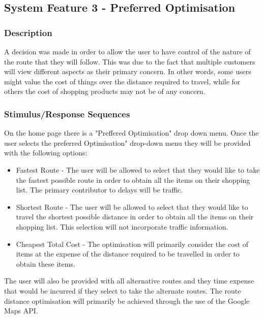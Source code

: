 \documentclass[10pt, a4paper, onecolumn]{scrartcl}
\begin{document}
		\subsection{System Feature 3 - Preferred Optimisation}
		
			\subsubsection{Description}
			
				A decision was made in order to allow the user to have control of the nature of the route that they will follow. This was due to the fact that multiple customers will view different aspects as their primary concern. In other words, some users might value the cost of things over the distance required to travel, while for others the cost of shopping products may not be of any concern. 
			
			\subsubsection{Stimulus/Response Sequences}
			
				On the home page there is a "Preffered Optimisation" drop down menu. Once the user selects the preferred Optimisation" drop-down menu they will be provided with the following options:
				
				\begin{itemize}
					\item Fastest Route - The user will be allowed to select that they would like to take the fastest possible route in order to obtain all the items on their shopping list. The primary contributor to delays will be traffic.
					\item Shortest Route - The user will be allowed to select that they would like to travel the shortest possible distance in order to obtain all the items on their shopping list. This selection will not incorporate traffic information.
					\item Cheapest Total Cost - The optimisation will primarily consider the cost of items at the expense of the distance required to be travelled in order to obtain these items. 
				\end{itemize}
				
				The user will also be provided with all alternative routes and they time expense that would be incurred if they select to take the alternate routes. The route distance optimisation will primarily be achieved through the use of the Google Maps API.
			
\end{document}
